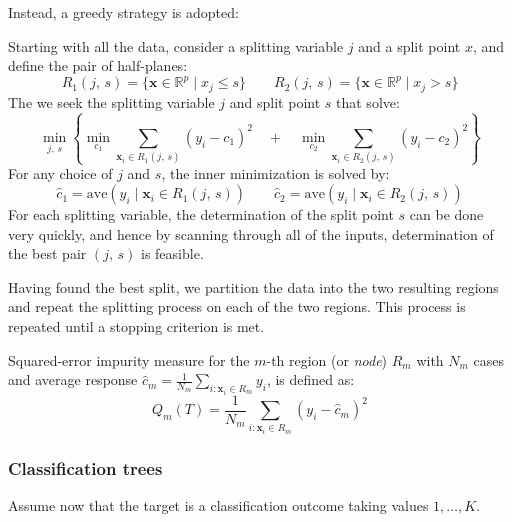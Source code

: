 Instead, a greedy strategy is adopted:
\begin{algorithm}{}{}
	Starting with all the data, consider a splitting variable $j$ and a split point $x$,
	and define the pair of half-planes:
	\begin{equation*}
		R_1(j,\,s) = \{ \boldsymbol x \in \mathds R^p \mid x_j \leq s \} \qquad
		R_2(j,\,s) = \{ \boldsymbol x \in \mathds R^p \mid x_j > s \}
	\end{equation*}
	The we seek the splitting variable $j$ and split point $s$ that solve:
	\begin{equation*}
		\min_{j,\,s} \left\{
		\min_{c_1} \sum_{\boldsymbol x_i \in R_1(j,\,s)} (y_i - c_1)^2
		\quad+\quad \min_{c_2} \sum_{\boldsymbol x_i \in R_2(j,\,s)} (y_i - c_2)^2
		\right\}
	\end{equation*}
	For any choice of $j$ and $s$, the inner minimization is solved by:
	\begin{equation*}
		\hat{c}_1 = \text{ave}(y_i \mid \boldsymbol x_i \in R_1(j,\,s)) \qquad
		\hat{c}_2 = \text{ave}(y_i \mid \boldsymbol x_i \in R_2(j,\,s))
	\end{equation*}
	For each splitting variable, the determination of the split point $s$ can
	be done very quickly, and hence by scanning through all of the inputs,
	determination of the best pair $(j,\,s)$ is feasible.

	Having found the best split, we partition the data into the two resulting regions and repeat the
	splitting process on each of the two regions. This process is repeated until a stopping
	criterion is met.
\end{algorithm}

\begin{definition}{Squared-error impurity measure}{}
	for the $m$-th region (or \emph{node}) $R_m$ with $N_m$ cases and average
	response $\hat{c}_m = \frac{1}{N_m} \sum_{i: \boldsymbol x_i \in R_m} y_i$,
	is defined as:
	\begin{equation*}
		Q_m(T) = \frac{1}{N_m} \sum_{i: \boldsymbol x_i \in R_m} (y_i - \hat{c}_m)^2
	\end{equation*}
\end{definition}

\subsubsection{Classification trees}

Assume now that the target is a classification outcome taking values $1,\dots,K$.

